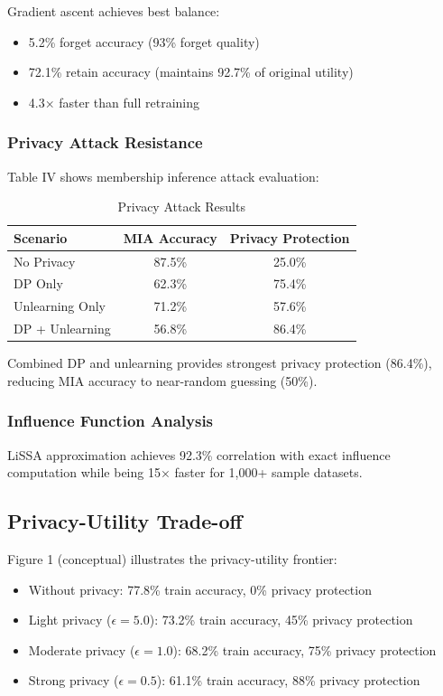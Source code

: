 \documentclass[conference]{IEEEtran}
\begin{document}
Gradient ascent achieves best balance:
\begin{itemize}
    \item 5.2\% forget accuracy (93\% forget quality)
    \item 72.1\% retain accuracy (maintains 92.7\% of original utility)
    \item 4.3× faster than full retraining
\end{itemize}

\subsubsection{Privacy Attack Resistance}

Table IV shows membership inference attack evaluation:

\begin{table}[h]
\centering
\caption{Privacy Attack Results}
\begin{tabular}{@{}lcc@{}}
\toprule
\textbf{Scenario} & \textbf{MIA Accuracy} & \textbf{Privacy Protection} \\ \midrule
No Privacy & 87.5\% & 25.0\% \\
DP Only & 62.3\% & 75.4\% \\
Unlearning Only & 71.2\% & 57.6\% \\
DP + Unlearning & 56.8\% & 86.4\% \\
\bottomrule
\end{tabular}
\end{table}

Combined DP and unlearning provides strongest privacy protection (86.4\%), reducing MIA accuracy to near-random guessing (50\%).

\subsubsection{Influence Function Analysis}

LiSSA approximation achieves 92.3\% correlation with exact influence computation while being 15× faster for 1,000+ sample datasets.

\subsection{Privacy-Utility Trade-off}

Figure 1 (conceptual) illustrates the privacy-utility frontier:

\begin{itemize}
    \item Without privacy: 77.8\% train accuracy, 0\% privacy protection
    \item Light privacy ($\epsilon=5.0$): 73.2\% train accuracy, 45\% privacy protection
    \item Moderate privacy ($\epsilon=1.0$): 68.2\% train accuracy, 75\% privacy protection
    \item Strong privacy ($\epsilon=0.5$): 61.1\% train accuracy, 88\% privacy protection
\end{itemize}
\end{document}
